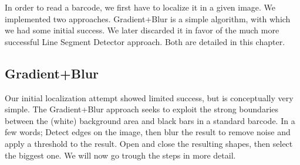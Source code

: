 In order to read a barcode, we first have to localize it in a given image. We implemented two approaches. Gradient+Blur is a simple algorithm, with which we had some initial success. We later discarded it in favor of the much more successful Line Segment Detector approach. Both are detailed in this chapter.

\subsection{Gradient+Blur}
Our initial localization attempt showed limited success, but is conceptually very simple. The Gradient+Blur approach seeks to exploit the strong boundaries between the (white) background area and black bars in a standard barcode. In a few words; Detect edges on the image, then blur the result to remove noise and apply a threshold to the result. Open and close the resulting shapes, then select the biggest one. We will now go trough the steps in more detail.


